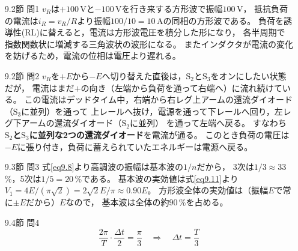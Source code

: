 \answer
\begin{enumerate}

\item[9.2節 問1]
$v_R$は$+100$\,Vと$-100$\,Vを行き来する方形波で振幅$100$\,V，
抵抗負荷の電流は$i_R = v_R/R$より振幅$100/10 = 10$\,Aの同相の方形波である。
負荷を誘導性(RL)に替えると，電流は方形波電圧を積分した形になり，
各半周期で指数関数状に増減する三角波状の波形になる。
またインダクタが電流の変化を妨げるため，電流の位相は電圧より遅れる。

\item[9.2節 問2]
$v_R$を$+E$から$-E$へ切り替えた直後は，$\mathrm{S}_2$と$\mathrm{S}_3$をオンにしたい状態だが，
電流はまだ$+$の向き（左端から負荷を通って右端へ）に流れ続けている。
この電流はデッドタイム中，右端から右レグ上アームの還流ダイオード（$\mathrm{S}_3$に並列）を通って
上レールへ抜け，電源を通って下レールへ回り，左レグ下アームの還流ダイオード（$\mathrm{S}_2$に並列）
を通って左端へ戻る。
すなわち\textbf{$\mathrm{S}_2$と$\mathrm{S}_3$に並列な2つの還流ダイオード}を電流が通る。
このとき負荷の電圧は$-E$に張り付き，負荷に蓄えられていたエネルギーは電源へ戻る。

\item[9.3節 問3]
式\ref{eq9.8}より高調波の振幅は基本波の$1/n$だから，
3次は$1/3 \approx 33$\,\%，5次は$1/5 = 20$\,\%である。
基本波の実効値は式\ref{eq9.11}より$V_1 = 4E/(\pi\sqrt{2}) = 2\sqrt{2}E/\pi \approx 0.90E$。
方形波全体の実効値は（振幅$E$で常に$\pm E$だから）$E$なので，
基本波は全体の約$90$\,\%を占める。

\item[9.4節 問4]
\begin{equation*}
\frac{2\pi}{T}\cdot\frac{\mathit{\Delta}t}{2} = \frac{\pi}{3}
\quad\Rightarrow\quad
\mathit{\Delta}t = \frac{T}{3}
\end{equation*}


\end{enumerate}
